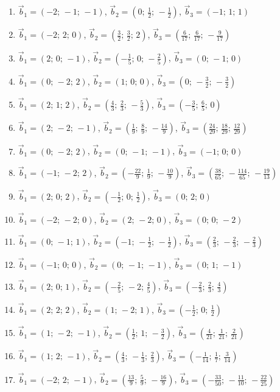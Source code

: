 \begin{enumerate}[label=\arabic*., leftmargin=*, itemsep=1pt]
\item $\vec b_1=(-2;\,-1;\,-1)$, $\vec b_2=(0;\,\frac{1}{2};\,-\frac{1}{2})$, $\vec b_3=(-1;\,1;\,1)$
\item $\vec b_1=(-2;\,2;\,0)$, $\vec b_2=(\frac{3}{2};\,\frac{3}{2};\,2)$, $\vec b_3=(\frac{6}{17};\,\frac{6}{17};\,-\frac{9}{17})$
\item $\vec b_1=(2;\,0;\,-1)$, $\vec b_2=(-\frac{1}{5};\,0;\,-\frac{2}{5})$, $\vec b_3=(0;\,-1;\,0)$
\item $\vec b_1=(0;\,-2;\,2)$, $\vec b_2=(1;\,0;\,0)$, $\vec b_3=(0;\,-\frac{3}{2};\,-\frac{3}{2})$
\item $\vec b_1=(2;\,1;\,2)$, $\vec b_2=(\frac{4}{3};\,\frac{2}{3};\,-\frac{5}{3})$, $\vec b_3=(-\frac{3}{5};\,\frac{6}{5};\,0)$
\item $\vec b_1=(2;\,-2;\,-1)$, $\vec b_2=(\frac{1}{9};\,\frac{8}{9};\,-\frac{14}{9})$, $\vec b_3=(\frac{24}{29};\,\frac{18}{29};\,\frac{12}{29})$
\item $\vec b_1=(0;\,-2;\,2)$, $\vec b_2=(0;\,-1;\,-1)$, $\vec b_3=(-1;\,0;\,0)$
\item $\vec b_1=(-1;\,-2;\,2)$, $\vec b_2=(-\frac{22}{9};\,\frac{1}{9};\,-\frac{10}{9})$, $\vec b_3=(\frac{38}{65};\,-\frac{114}{65};\,-\frac{19}{13})$
\item $\vec b_1=(2;\,0;\,2)$, $\vec b_2=(-\frac{1}{2};\,0;\,\frac{1}{2})$, $\vec b_3=(0;\,2;\,0)$
\item $\vec b_1=(-2;\,-2;\,0)$, $\vec b_2=(2;\,-2;\,0)$, $\vec b_3=(0;\,0;\,-2)$
\item $\vec b_1=(0;\,-1;\,1)$, $\vec b_2=(-1;\,-\frac{1}{2};\,-\frac{1}{2})$, $\vec b_3=(\frac{2}{3};\,-\frac{2}{3};\,-\frac{2}{3})$
\item $\vec b_1=(-1;\,0;\,0)$, $\vec b_2=(0;\,-1;\,-1)$, $\vec b_3=(0;\,1;\,-1)$
\item $\vec b_1=(2;\,0;\,1)$, $\vec b_2=(-\frac{2}{5};\,-2;\,\frac{4}{5})$, $\vec b_3=(-\frac{2}{3};\,\frac{2}{3};\,\frac{4}{3})$
\item $\vec b_1=(2;\,2;\,2)$, $\vec b_2=(1;\,-2;\,1)$, $\vec b_3=(-\frac{1}{2};\,0;\,\frac{1}{2})$
\item $\vec b_1=(1;\,-2;\,-1)$, $\vec b_2=(\frac{1}{2};\,1;\,-\frac{3}{2})$, $\vec b_3=(\frac{4}{21};\,\frac{1}{21};\,\frac{2}{21})$
\item $\vec b_1=(1;\,2;\,-1)$, $\vec b_2=(\frac{4}{3};\,-\frac{1}{3};\,\frac{2}{3})$, $\vec b_3=(-\frac{1}{14};\,\frac{1}{7};\,\frac{3}{14})$
\item $\vec b_1=(-2;\,2;\,-1)$, $\vec b_2=(\frac{13}{9};\,\frac{5}{9};\,-\frac{16}{9})$, $\vec b_3=(-\frac{33}{50};\,-\frac{11}{10};\,-\frac{22}{25})$

\end{enumerate}
